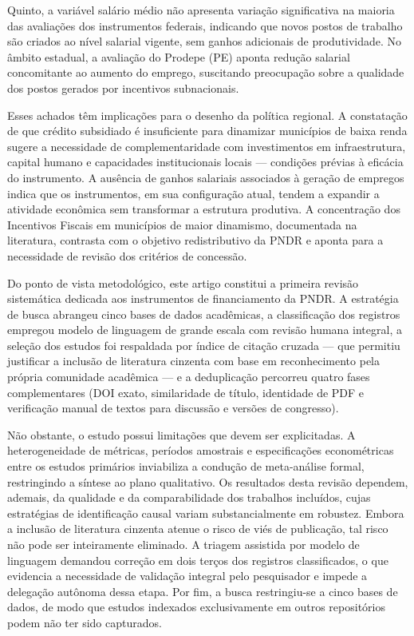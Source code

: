Quinto, a variável salário médio não apresenta variação significativa na maioria das avaliações dos instrumentos federais, indicando que novos postos de trabalho são criados ao nível salarial vigente, sem ganhos adicionais de produtividade. No âmbito estadual, a avaliação do Prodepe (PE) aponta redução salarial concomitante ao aumento do emprego, suscitando preocupação sobre a qualidade dos postos gerados por incentivos subnacionais.

Esses achados têm implicações para o desenho da política regional. A constatação de que crédito subsidiado é insuficiente para dinamizar municípios de baixa renda sugere a necessidade de complementaridade com investimentos em infraestrutura, capital humano e capacidades institucionais locais --- condições prévias à eficácia do instrumento. A ausência de ganhos salariais associados à geração de empregos indica que os instrumentos, em sua configuração atual, tendem a expandir a atividade econômica sem transformar a estrutura produtiva. A concentração dos Incentivos Fiscais em municípios de maior dinamismo, documentada na literatura, contrasta com o objetivo redistributivo da PNDR e aponta para a necessidade de revisão dos critérios de concessão.

Do ponto de vista metodológico, este artigo constitui a primeira revisão sistemática dedicada aos instrumentos de financiamento da PNDR. A estratégia de busca abrangeu cinco bases de dados acadêmicas, a classificação dos registros empregou modelo de linguagem de grande escala com revisão humana integral, a seleção dos estudos foi respaldada por índice de citação cruzada --- que permitiu justificar a inclusão de literatura cinzenta com base em reconhecimento pela própria comunidade acadêmica --- e a deduplicação percorreu quatro fases complementares (DOI exato, similaridade de título, identidade de PDF e verificação manual de textos para discussão e versões de congresso).

Não obstante, o estudo possui limitações que devem ser explicitadas. A heterogeneidade de métricas, períodos amostrais e especificações econométricas entre os estudos primários inviabiliza a condução de meta-análise formal, restringindo a síntese ao plano qualitativo. Os resultados desta revisão dependem, ademais, da qualidade e da comparabilidade dos trabalhos incluídos, cujas estratégias de identificação causal variam substancialmente em robustez. Embora a inclusão de literatura cinzenta atenue o risco de viés de publicação, tal risco não pode ser inteiramente eliminado. A triagem assistida por modelo de linguagem demandou correção em dois terços dos registros classificados, o que evidencia a necessidade de validação integral pelo pesquisador e impede a delegação autônoma dessa etapa. Por fim, a busca restringiu-se a cinco bases de dados, de modo que estudos indexados exclusivamente em outros repositórios podem não ter sido capturados.

